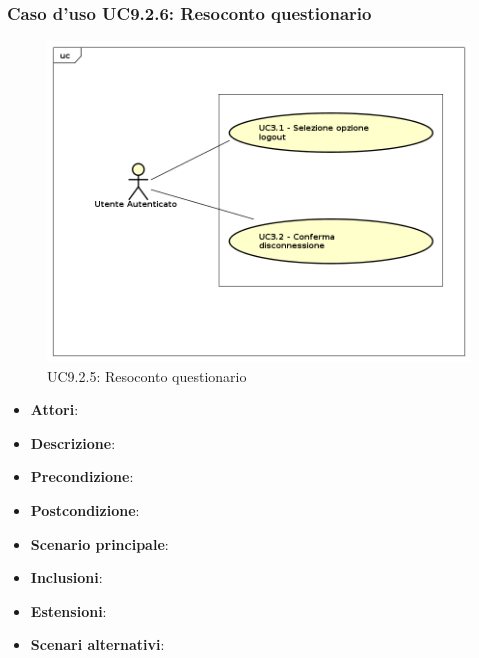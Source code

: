 		\subsubsection{Caso d'uso UC9.2.6: Resoconto questionario}
		\label{UC9.2.5}
		\begin{figure}[h]
			\centering
		\includegraphics[scale=0.7,keepaspectratio]{UML/UC9.png}
			\caption{UC9.2.5: Resoconto questionario}
		\end{figure}
		\FloatBarrier
		\begin{itemize}
			\item \textbf{Attori}: 
			\item \textbf{Descrizione}: 
			\item \textbf{Precondizione}: 
			\item \textbf{Postcondizione}: 
			\item \textbf{Scenario principale}:
			\item \textbf{Inclusioni}:
			\item \textbf{Estensioni}:
			\item \textbf{Scenari alternativi}:
		\end{itemize}
		
